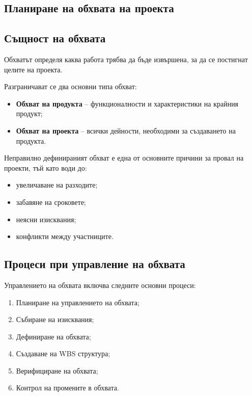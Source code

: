 \documentclass{scrartcl}
\begin{document}
\begin{FlushLeft}
\section{Планиране на обхвата на проекта}

\subsection{Същност на обхвата}

Обхватът определя каква работа трябва да бъде извършена, за да се постигнат целите на проекта.

Разграничават се два основни типа обхват:

\begin{itemize}
    \item \textbf{Обхват на продукта} – функционалности и характеристики на крайния продукт;
    \item \textbf{Обхват на проекта} – всички дейности, необходими за създаването на продукта.
\end{itemize}

Неправилно дефинираният обхват е една от основните причини за провал на проекти, тъй като води до:

\begin{itemize}
    \item увеличаване на разходите;
    \item забавяне на сроковете;
    \item неясни изисквания;
    \item конфликти между участниците.
\end{itemize}

\subsection{Процеси при управление на обхвата}

Управлението на обхвата включва следните основни процеси:

\begin{enumerate}
    \item Планиране на управлението на обхвата;
    \item Събиране на изисквания;
    \item Дефиниране на обхвата;
    \item Създаване на WBS структура;
    \item Верифициране на обхвата;
    \item Контрол на промените в обхвата.
\end{enumerate}


\end{FlushLeft}
\end{document}
